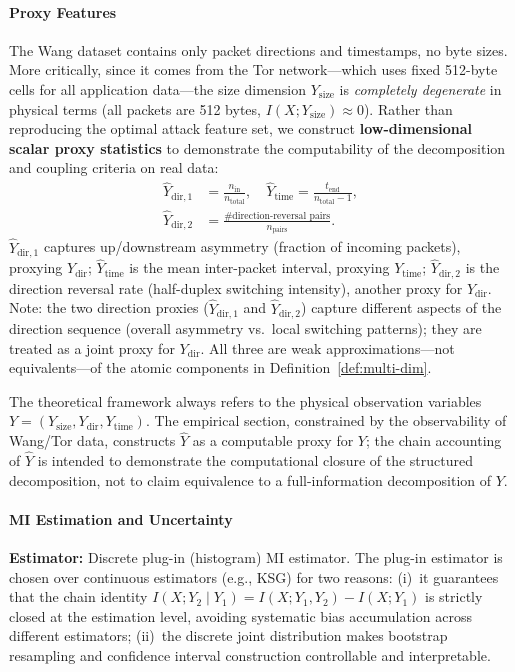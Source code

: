 \documentclass[lettersize,journal]{IEEEtran}
\begin{document}
\paragraph{Proxy Features}
The Wang dataset contains only packet directions and timestamps, no byte
sizes.
More critically, since it comes from the Tor network---which uses fixed
512-byte cells for all application data---the size dimension
$Y_{\mathrm{size}}$ is \emph{completely degenerate} in physical terms
(all packets are 512 bytes, $I(X;Y_{\mathrm{size}})\approx 0$).
Rather than reproducing the optimal attack feature set, we construct
\textbf{low-dimensional scalar proxy statistics} to demonstrate the
computability of the decomposition and coupling criteria on real data:
\begin{align*}
\hat{Y}_{\mathrm{dir},1} &= \frac{n_{\mathrm{in}}}{n_{\mathrm{total}}},\quad
\hat{Y}_{\mathrm{time}} = \frac{t_{\mathrm{end}}}{n_{\mathrm{total}}-1},\\
\hat{Y}_{\mathrm{dir},2} &= \frac{\#\text{direction-reversal pairs}}{n_{\mathrm{pairs}}}.
\end{align*}
$\hat{Y}_{\mathrm{dir},1}$ captures up/downstream asymmetry (fraction of
incoming packets), proxying $Y_{\mathrm{dir}}$;
$\hat{Y}_{\mathrm{time}}$ is the mean inter-packet interval, proxying
$Y_{\mathrm{time}}$;
$\hat{Y}_{\mathrm{dir},2}$ is the direction reversal rate (half-duplex
switching intensity), another proxy for $Y_{\mathrm{dir}}$.
Note: the two direction proxies ($\hat{Y}_{\mathrm{dir},1}$ and
$\hat{Y}_{\mathrm{dir},2}$) capture different aspects of the direction
sequence (overall asymmetry vs.\ local switching patterns); they are
treated as a joint proxy for $Y_{\mathrm{dir}}$.
All three are weak approximations---not equivalents---of the atomic
components in Definition~\ref{def:multi-dim}.

The theoretical framework always refers to the physical observation
variables $Y=(Y_{\mathrm{size}},Y_{\mathrm{dir}},Y_{\mathrm{time}})$.
The empirical section, constrained by the observability of Wang/Tor data,
constructs $\hat{Y}$ as a computable proxy for $Y$; the chain accounting
of $\hat{Y}$ is intended to demonstrate the computational closure of the
structured decomposition, not to claim equivalence to a full-information
decomposition of $Y$.

\paragraph{MI Estimation and Uncertainty}
\textbf{Estimator:} Discrete plug-in (histogram) MI estimator.
The plug-in estimator is chosen over continuous estimators (e.g., KSG)
for two reasons:
(i)~it guarantees that the chain identity
$I(X;Y_2\mid Y_1)=I(X;Y_1,Y_2)-I(X;Y_1)$
is strictly closed at the estimation level, avoiding systematic bias
accumulation across different estimators;
(ii)~the discrete joint distribution makes bootstrap resampling and
confidence interval construction controllable and interpretable.
\end{document}
